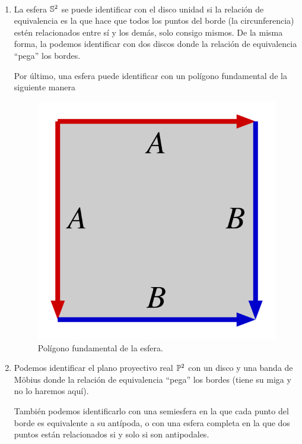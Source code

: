 \begin{exa}\
	\begin{enumerate}
		\item La esfera $\mathbb{S}^2$ se puede identificar con el disco unidad si la relación de equivalencia es la que hace que todos los puntos del borde (la circunferencia) estén relacionados entre sí y los demás, solo consigo mismos. De la misma forma, la podemos identificar con dos discos donde la relación de equivalencia ``pega'' los bordes.
		
		Por último, una esfera puede identificar con un polígono fundamental de la siguiente manera
		
		\begin{figure}[h!]
			\centering
			\includegraphics[scale = 0.1]{img/pol_fund_esfera}
			\caption{Polígono fundamental de la esfera.}
		\end{figure}
		
		\item Podemos identificar el plano proyectivo real $\mathbb{P}^2$ con un disco y una banda de Möbius donde la relación de equivalencia ``pega'' los bordes (tiene su miga y no lo haremos aquí).
		
		También podemos identificarlo con una semiesfera en la que cada punto del borde es equivalente a su antípoda, o con una esfera completa en la que dos puntos están relacionados si y solo si son antipodales.
		

\end{enumerate}
\end{exa}

